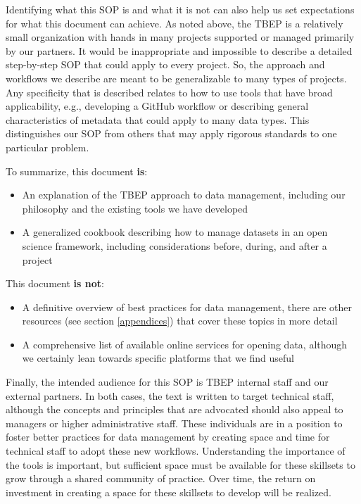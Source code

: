 \documentclass[
]{book}
\providecommand{\tightlist}{%
  \setlength{\itemsep}{0pt}\setlength{\parskip}{0pt}}
\begin{document}
Identifying what this SOP is and what it is not can also help us set expectations for what this document can achieve. As noted above, the TBEP is a relatively small organization with hands in many projects supported or managed primarily by our partners. It would be inappropriate and impossible to describe a detailed step-by-step SOP that could apply to every project. So, the approach and workflows we describe are meant to be generalizable to many types of projects. Any specificity that is described relates to how to use tools that have broad applicability, e.g., developing a GitHub workflow or describing general characteristics of metadata that could apply to many data types. This distinguishes our SOP from others that may apply rigorous standards to one particular problem.

To summarize, this document \textbf{is}:

\begin{itemize}
\tightlist
\item
  An explanation of the TBEP approach to data management, including our philosophy and the existing tools we have developed
\item
  A generalized cookbook describing how to manage datasets in an open science framework, including considerations before, during, and after a project
\end{itemize}

This document \textbf{is not}:

\begin{itemize}
\tightlist
\item
  A definitive overview of best practices for data management, there are other resources (see section \ref{appendices}) that cover these topics in more detail
\item
  A comprehensive list of available online services for opening data, although we certainly lean towards specific platforms that we find useful
\end{itemize}

Finally, the intended audience for this SOP is TBEP internal staff and our external partners. In both cases, the text is written to target technical staff, although the concepts and principles that are advocated should also appeal to managers or higher administrative staff. These individuals are in a position to foster better practices for data management by creating space and time for technical staff to adopt these new workflows. Understanding the importance of the tools is important, but sufficient space must be available for these skillsets to grow through a shared community of practice. Over time, the return on investment in creating a space for these skillsets to develop will be realized.
\end{document}
